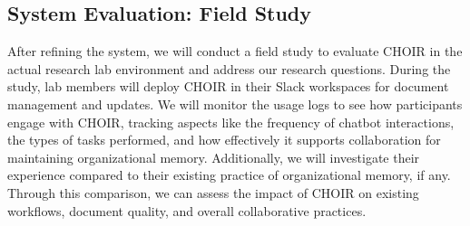 \documentclass[sigconf,screen]{acmart}
\begin{document}
\subsection{System Evaluation: Field Study}
After refining the system, we will conduct a field study to evaluate CHOIR in the actual research lab environment and address our research questions. During the study, lab members will deploy CHOIR in their Slack workspaces for document management and updates. We will monitor the usage logs to see how participants engage with CHOIR, tracking aspects like the frequency of chatbot interactions, the types of tasks performed, and how effectively it supports collaboration for maintaining organizational memory. Additionally, we will investigate their experience compared to their existing practice of organizational memory, if any.
Through this comparison, we can assess the impact of CHOIR on existing workflows, document quality, and overall collaborative practices. 



\end{document}
